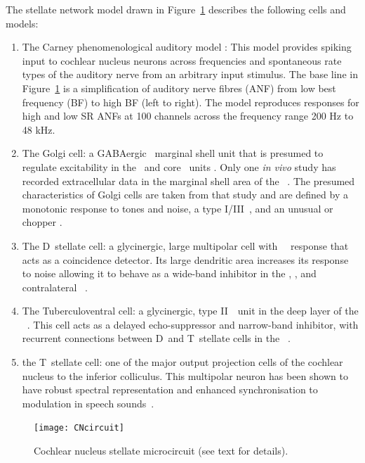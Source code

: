 The stellate
network model drawn in Figure~\ref{fig:microcircuit} describes the following cells
and models:
\begin{enumerate}
\item The Carney phenomenological auditory model \citet{ZilanyBruceEtAl:2009}:
  This model provides spiking input to cochlear nucleus neurons across
  frequencies and spontaneous rate types of the auditory nerve from an arbitrary
  input stimulus. The base line in Figure~\ref{fig:microcircuit} is a
  simplification of auditory nerve fibres (ANF) from low best frequency (BF) to
  high BF (left to right). The model reproduces responses for high and low SR
  ANFs at 100 channels across the frequency range 200 Hz to 48 kHz.
\item The Golgi cell: a {GABA}ergic \VCN~marginal shell unit that is presumed to
  regulate excitability in the \GCD~and core \VCN~units
  \citep{FerragamoGoldingEtAl:1998}. Only one \textit{in vivo} study has
  recorded extracellular data in the marginal shell area of the
  \CN~\citep{GhoshalKim:1997}. The presumed characteristics of Golgi cells are
  taken from that study and are defined by a monotonic response to tones and
  noise, a type I\slash III~\EIRA, and an unusual or chopper {\PSTH}.
\item The D~stellate cell: a glycinergic, large multipolar cell with
  \OnC~\PSTH~response that acts as a coincidence detector. Its large dendritic
  area increases its response to noise allowing it to behave as a wide-band
  inhibitor in the \VCN, \DCN, and contralateral
  \CN~\citep{SmithMassieEtAl:2005,ArnottWallaceEtAl:2004,NeedhamPaolini:2007}.
\item The Tuberculoventral cell: a glycinergic, type II~{\EIRA}~unit in the deep
  layer of the \DCN~\citep{SpirouDavisEtAl:1999}.  This cell acts as a delayed
  echo-suppressor and narrow-band inhibitor, with recurrent connections between
  D~and T~stellate cells in the \VCN~\citep{Alibardi:2006,OertelWickesberg:1993,WickesbergWhitlonEtAl:1991}.
\item the T~stellate cell: one of the major output projection cells of the
  cochlear nucleus to the inferior colliculus. This multipolar neuron has been
  shown to have robust spectral representation and enhanced synchronisation to
  modulation in speech sounds~\citep{BlackburnSachs:1990,KeilsonRichardsEtAl:1997}.
\end{enumerate}

\begin{figure}[htb]
  \centering
  \texttt{[image: CNcircuit]}
  \caption[Cochlear nucleus stellate microcircuit]{Cochlear nucleus stellate microcircuit (see text for details). }
  \label{fig:microcircuit}
\end{figure}

